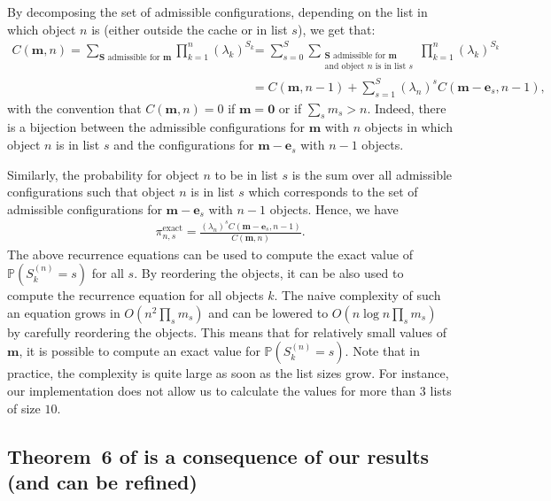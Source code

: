 \documentclass[acmsmall]{acmart}
\newcommand\be{\mathbf{e}}
\newcommand\bm{\mathbf{m}}
\newcommand\bS{\mathbf{S}}
\newcommand\Proba[1]{\mathbb{P}\left(#1\right)} %
\begin{document}
By decomposing the set of admissible configurations, depending on the list in which object $n$ is (either outside the cache or in list $s$), we get that:
\begin{align*}
  C(\bm,n)=\sum_{\text{$\bS$ admissible for $\bm$}}\prod_{k=1}^n (\lambda_k)^{S_k}
  &=\sum_{s=0}^S \sum_{\substack{\text{$\bS$ admissible for $\bm$} \\ \text{and object $n$ is in list $s$}}}\prod_{k=1}^n (\lambda_k)^{S_k}\\
  &= C(\bm,n-1)+\sum_{s=1}^S (\lambda_n)^{s}C(\bm-\be_s,n-1),
\end{align*}
with the convention that $C(\bm,n)=0$ if $\bm=\mathbf{0}$ or if $\sum_s m_s>n$. Indeed, there is a bijection between the admissible configurations for $\bm$ with $n$ objects in which object $n$ is in list $s$ and the configurations for $\bm-\be_s$ with $n-1$ objects.

Similarly, the probability for object $n$ to be in list $s$ is the sum over all admissible configurations such that object $n$ is in list $s$ which corresponds to the set of admissible configurations for $\bm-\be_s$ with $n-1$ objects. Hence, we have
\begin{align}
  \label{eq:cache_exact}
  \pi_{n,s}^{\text{exact}} = \frac{(\lambda_n)^s C(\bm-\be_s, n-1)}{C(\bm,n)}.
\end{align}
The above recurrence equations can be used to compute the exact value of $\Proba{S_k^{(n)}=s}$ for all $s$. By reordering the objects, it can be also used to compute the recurrence equation for all objects $k$. The naive complexity of such an equation grows in $O(n^2\prod_{s}m_s)$ and can be lowered to $O(n\log n\prod_{s}m_s)$ by carefully reordering the objects. This means that for relatively small values of $\bm$, it is possible to compute an exact value for $\Proba{S^{(n)}_k=s}$. Note that in practice, the complexity is quite large as soon as the list sizes grow. For instance, our implementation does not allow us to calculate the values for more than $3$ lists of size $10$.


\subsection{Theorem~6 of \cite{gastTransientSteadystateRegime2015} is a consequence of our results (and can be refined)}
\label{apx:cache_adaptation2}
\end{document}
